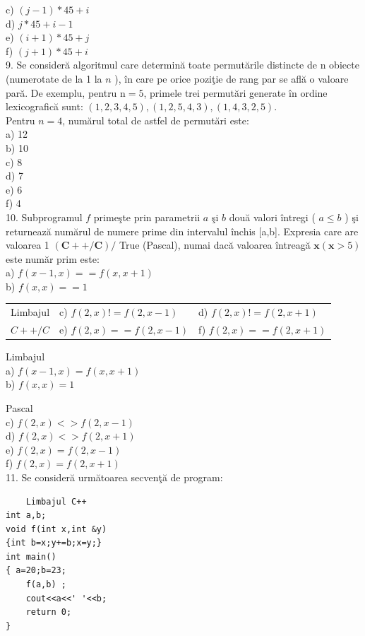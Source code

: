 \documentclass[10pt]{article}
\begin{document}
c) $(j-1) * 45+i$\\
d) $j * 45+i-1$\\
e) $(i+1) * 45+j$\\
f) $(j+1) * 45+i$\\
9. Se consideră algoritmul care determină toate permutările distincte de n obiecte (numerotate de la 1 la $n$ ), în care pe orice poziţie de rang par se află o valoare pară. De exemplu, pentru $\mathrm{n}=5$, primele trei permutări generate în ordine lexicografică sunt: $(1,2,3,4,5),(1,2,5,4,3),(1,4,3,2,5)$.\\
Pentru $n=4$, numărul total de astfel de permutări este:\\
a) 12\\
b) 10\\
c) 8\\
d) 7\\
e) 6\\
f) 4\\
10. Subprogramul $f$ primeşte prin parametrii $a$ şi $b$ două valori întregi ( $a \leq b$ ) şi returnează numărul de numere prime din intervalul închis [a,b]. Expresia care are valoarea 1 $(\mathbf{C}++/ \mathbf{C}) /$ True (Pascal), numai dacă valoarea întreagă $\mathbf{x}(\mathbf{x}>5)$ este număr prim este:\\
a) $f(x-1, x)==f(x, x+1)$\\
b) $f(x, x)==1$

\begin{center}
\begin{tabular}{lll}
Limbajul & c) $f(2, x)!=f(2, x-1)$ & d) $f(2, x)!=f(2, x+1)$ \\
$C++/ C$ & e) $f(2, x)==f(2, x-1)$ & f) $f(2, x)==f(2, x+1)$ \\
\end{tabular}
\end{center}

Limbajul\\
a) $f(x-1, x)=f(x, x+1)$\\
b) $f(x, x)=1$

Pascal\\
c) $f(2, x)<>f(2, x-1)$\\
d) $f(2, x)<>f(2, x+1)$\\
e) $f(2, x)=f(2, x-1)$\\
f) $f(2, x)=f(2, x+1)$\\
11. Se consideră următoarea secvenţă de program:

\begin{verbatim}
    Limbajul C++
int a,b;
void f(int x,int &y)
{int b=x;y+=b;x=y;}
int main()
{ a=20;b=23;
    f(a,b) ;
    cout<<a<<' '<<b;
    return 0;
}
\end{verbatim}
\end{document}
